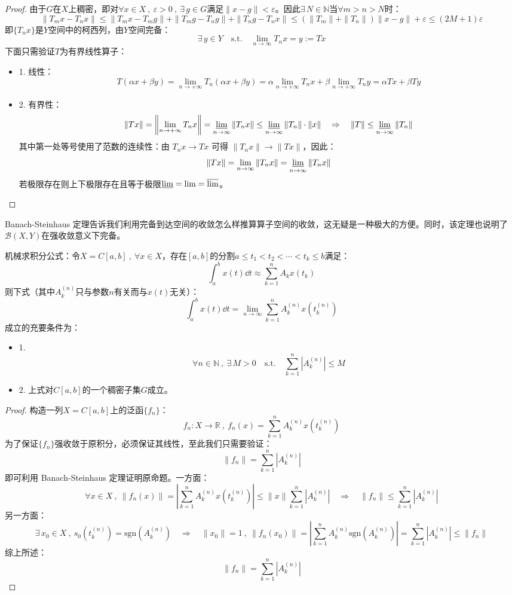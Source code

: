 \begin{proof}
由于$G$在$X$上稠密，即对$\forall x \in X \ , \ \varepsilon>0\ , \ \exists \, g \in G$满足$\|x-g\|<\varepsilon$。因此$\exists \, N \in \mathbb{N}$当$\forall m>n>N$时：
\[\|T_mx-T_nx\| \leq \|T_mx-T_mg\|+\|T_mg-T_ng\|+\|T_ng-T_nx\| \leq \left(\|T_m\|+\|T_n\|\right)\|x-g\|+\varepsilon \leq (2M+1)\varepsilon\]
即$\{T_nx\}$是$Y$空间中的柯西列，由$Y$空间完备：
\[\exists \, y \in Y \quad \text{s.t.} \quad \lim_{n \to \infty}T_nx=y:=Tx\]
下面只需验证$T$为有界线性算子：
\begin{itemize}
\item 1. 线性：
\[T(\alpha x+\beta y)=\lim_{n \to +\infty}T_n(\alpha x+\beta y)=\alpha\lim_{n \to +\infty}T_nx+\beta\lim_{n \to +\infty}T_ny=\alpha Tx+\beta Ty\]
\item 2. 有界性：
\[\|Tx\|=\left\|\lim_{n \to +\infty}T_nx\right\|=\varliminf\limits_{n\to\infty}\|T_nx\| \leq \varliminf\limits_{n\to\infty}\|T_n\| \cdot \|x\| \quad \Rightarrow \quad \|T\| \leq \varliminf\limits_{n\to\infty}\|T_n\|\]
其中第一处等号使用了范数的连续性：由 $T_nx\to Tx$ 可得 $\|T_nx\|\to\|Tx\|$，因此：
\[\|Tx\|=\lim_{n\to\infty}\|T_nx\|=\varliminf_{n\to\infty}\|T_nx\|\]
若极限存在则上下极限存在且等于极限$\varliminf=\lim=\varlimsup$。
\end{itemize}
\end{proof}

Banach-Steinhaus 定理告诉我们利用完备到达空间的收敛怎么样推算算子空间的收敛，这无疑是一种极大的方便。同时，该定理也说明了$\mathscr{B}(X,Y)$在强收敛意义下完备。

\begin{example}
\quad 机械求积分公式：令$X=C[a,b] \ , \ \forall x \in X$，存在$[a,b]$的分割$a \leq t_1<t_2<\cdots<t_k\leq b$满足：
\[\int_a^bx(t)\dd t \approx \sum_{k=1}^nA_kx(t_k)\]
则下式（其中$A_k^{(n)}$只与参数$n$有关而与$x(t)$无关）：
\[\int_a^bx(t)\dd t=\lim_{n \to \infty}\sum_{k=1}^nA_k^{(n)}x(t_k^{(n)})\]
成立的充要条件为：
\begin{itemize}
\item 1. 
\[\forall n \in \mathbb{N} \ , \ \exists \, M>0 \quad \text{s.t.} \quad \sum_{k=1}^n\left|A_k^{(n)}\right| \leq M\]
\item 2. 上式对$C[a,b]$的一个稠密子集$G$成立。
\end{itemize}
\end{example}
\begin{proof}
构造一列$X=C[a,b]$上的泛函$\{f_n\}$：
\[f_n:X \to \mathbb{R} \ , \ f_n(x)=\sum_{k=1}^nA_k^{(n)}x(t_k^{(n)})\]
为了保证$\{f_n\}$强收敛于原积分，必须保证其线性，至此我们只需要验证：
\[\|f_n\|=\sum_{k=1}^n\left|A_k^{(n)}\right|\]
即可利用 Banach-Steinhaus 定理证明原命题。一方面：
\[\forall x \in X \ , \ \|f_n(x)\|=\left|\sum_{k=1}^nA_k^{(n)}x(t_k^{(n)})\right| \leq \|x\|\sum_{k=1}^n\left|A_k^{(n)}\right| \quad \Rightarrow \quad \|f_n\| \leq \sum_{k=1}^n\left|A_k^{(n)}\right|\]
另一方面：
\[\exists \, x_0 \in X \ , \ s_0(t_k^{(n)})=\text{sgn}(A_k^{(n)}) \quad \Rightarrow \quad \|x_0\|=1 \ , \ \|f_n(x_0)\|=\left|\sum_{k=1}^nA_k^{(n)}\text{sgn}(A_k^{(n)})\right|=\sum_{k=1}^n\left|A_k^{(n)}\right| \leq \|f_n\|\]
综上所述：
\[\|f_n\|=\sum_{k=1}^n\left|A_k^{(n)}\right|\]
\end{proof}

